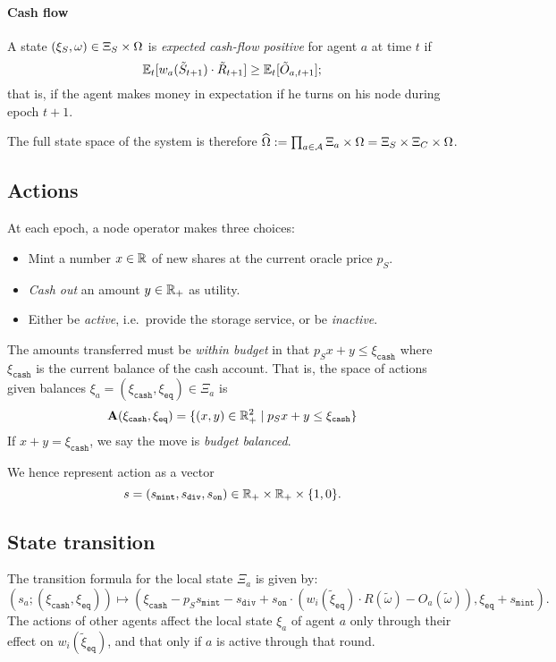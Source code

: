 \paragraph{Cash flow}
A state $(\xi_S,\omega)\in\Xi_S\times \Omega$ is \emph{expected cash-flow positive} for agent $a$ at time $t$ if 
\[
  \mathbb{E}_t[w_a(\tilde S_{t+1})\cdot \tilde{R}_{t+1}] \geq \mathbb{E}_t[ \tilde{O}_{a,t+1} ];
\]
that is, if the agent makes money in expectation if he turns on his node during epoch $t+1$.

  
The full state space of the system is therefore $\widehat{\Omega}:=\prod_{a\in\mathcal{A}}\Xi_a\times \Omega = \Xi_S\times\Xi_C\times\Omega$.

\subsection{Actions}

At each epoch, a node operator makes three choices:
%
\begin{itemize}
  \item Mint a number $x\in\mathbb{R}$ of new shares at the current oracle price $p_S$.
  \item \emph{Cash out} an amount $y\in\mathbb{R}_+$ as utility.
  \item Either be \emph{active}, i.e.~provide the storage service, or be \emph{inactive}.
\end{itemize}
%
The amounts transferred must be \emph{within budget} in that $p_Sx+y\leq \xi_\mathtt{cash}$ where $\xi_\mathtt{cash}$ is the current balance of the cash account.
%
That is, the space of actions given balances $\xi_a=(\xi_\mathtt{cash},\xi_\mathtt{eq})\in\Xi_a$ is
\[
  \mathbf{A}(\xi_\mathtt{cash},\xi_\mathtt{eq}) = \{(x,y)\in \mathbb{R}_+^2 \mid p_Sx+y\leq \xi_\mathtt{cash} \}
\]
%
If $x+y = \xi_\mathtt{cash}$, we say the move is \emph{budget balanced}.

We hence represent action as a vector
\[
  s = (s_\mathtt{mint},s_\mathtt{div},s_\mathtt{on}) \in \mathbb{R}_+ \times \mathbb{R}_+ \times \{1,0\}.
\]

\subsection{State transition}
The transition formula for the local state $\Xi_a$ is given by:
\[
  (s_a; (\xi_\mathtt{cash},\xi_\mathtt{eq})) \mapsto
    (\xi_\mathtt{cash}-p_Ss_\mathtt{mint} - s_\mathtt{div} + s_\mathtt{on}\cdot (w_i(\tilde{\xi}_\mathtt{eq})\cdot R(\tilde\omega) - O_a(\tilde\omega)), \xi_\mathtt{eq} + s_\mathtt{mint}).
\]
The actions of other agents affect the local state $\xi_a$ of agent $a$ only through their effect on $w_i(\tilde{\xi}_\mathtt{eq})$, and that only if $a$ is active through that round.

